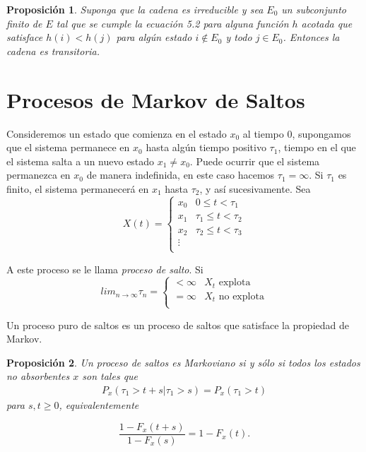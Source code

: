 \documentclass{article}
\newtheorem{Prop}{Proposición}
\begin{document}
\begin{Prop}\label{Prop.5.4}
Suponga que la cadena es irreducible y sea $E_{0}$ un subconjunto finito de $E$ tal que se cumple la ecuaci\'on 5.2 para alguna funci\'on $h$ acotada que satisface $h\left(i\right)<h\left(j\right)$ para alg\'un estado $i\notin E_{0}$ y todo $j\in E_{0}$. Entonces la cadena es transitoria.
\end{Prop}

%
\section{Procesos de Markov de Saltos}
%


Consideremos un estado que comienza en el estado $x_{0}$ al tiempo $0$, supongamos que el sistema permanece en $x_{0}$ hasta alg\'un tiempo positivo $\tau_{1}$, tiempo en el que el sistema salta a un nuevo estado $x_{1}\neq x_{0}$. Puede ocurrir que el sistema permanezca en $x_{0}$ de manera indefinida, en este caso hacemos $\tau_{1}=\infty$. Si $\tau_{1}$ es finito, el sistema permanecer\'a en $x_{1}$ hasta $\tau_{2}$, y as\'i sucesivamente.
Sea
\begin{equation}
X\left(t\right)=\left\{\begin{array}{cc}
x_{0} & 0\leq t<\tau_{1}\\
x_{1} & \tau_{1}\leq t<\tau_{2}\\
x_{2} & \tau_{2}\leq t<\tau_{3}\\
\vdots &\\
\end{array}\right.
\end{equation}

A este proceso  se le llama {\em proceso de salto}. Si
\begin{equation}
lim_{n\rightarrow\infty}\tau_{n}=\left\{\begin{array}{cc}
<\infty & X_{t}\textrm{ explota}\\
=\infty & X_{t}\textrm{ no explota}\\
\end{array}\right.
\end{equation}

Un proceso puro de saltos es un proceso de saltos que satisface la propiedad de Markov.

\begin{Prop}
Un proceso de saltos es Markoviano si y s\'olo si todos los estados no absorbentes $x$ son tales que
\begin{eqnarray*}
P_{x}\left(\tau_{1}>t+s|\tau_{1}>s\right)=P_{x}\left(\tau_{1}>t\right)
\end{eqnarray*}
para $s,t\geq0$, equivalentemente

\begin{equation}\label{Eq.5}
\frac{1-F_{x}\left(t+s\right)}{1-F_{x}\left(s\right)}=1-F_{x}\left(t\right).
\end{equation}
\end{Prop}
\end{document}
